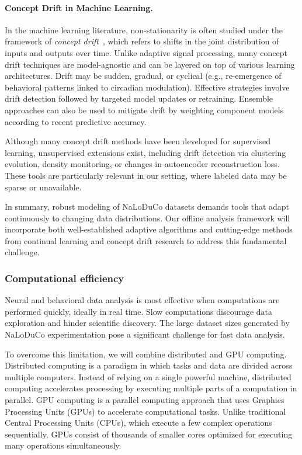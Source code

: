 \paragraph{Concept Drift in Machine Learning.}  

In the machine learning literature, non-stationarity is often studied under the
framework of \emph{concept drift}~\citep{conceptdriftReview}, which refers to
shifts in the joint distribution of inputs and outputs over time. Unlike
adaptive signal processing, many concept drift techniques are model-agnostic
and can be layered on top of various learning architectures. Drift may be
sudden, gradual, or cyclical (e.g., re-emergence of behavioral patterns linked
to circadian modulation). Effective strategies involve drift detection followed
by targeted model updates or retraining. Ensemble approaches can also be used
to mitigate drift by weighting component models according to recent predictive
accuracy.

Although many concept drift methods have been developed for supervised
learning, unsupervised extensions exist, including drift detection via
clustering evolution, density monitoring, or changes in autoencoder
reconstruction loss. These tools are particularly relevant in our setting,
where labeled data may be sparse or unavailable.

In summary, robust modeling of NaLoDuCo datasets demands tools that adapt
continuously to changing data distributions. Our offline analysis framework
will incorporate both well-established adaptive algorithms and cutting-edge
methods from continual learning and concept drift research to address this
fundamental challenge.

\subsubsection*{Computational efficiency}

Neural and behavioral data analysis is most effective when computations are
performed quickly, ideally in real time. Slow computations discourage data
exploration and hinder scientific discovery. The large dataset sizes generated by
NaLoDuCo experimentation pose a significant challenge for fast data analysis.

To overcome this limitation, we will combine distributed and GPU computing.
%
Distributed computing is a paradigm
in which tasks and data are divided across multiple computers. Instead of
relying on a single powerful machine, distributed computing accelerates
processing by executing multiple parts of a computation in parallel.
%
GPU computing is a parallel computing approach that uses Graphics Processing
Units (GPUs) to accelerate computational tasks. Unlike traditional Central
Processing Units (CPUs), which execute a few complex operations sequentially,
GPUs consist of thousands of smaller cores optimized for executing many
operations simultaneously.

